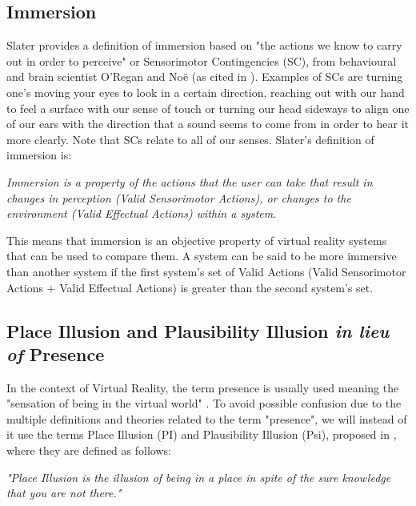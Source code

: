 \subsection{Immersion}
\label{subsec:immersion}

Slater provides a definition of immersion based on "the actions we know to carry out in order to perceive" or Sensorimotor Contingencies (SC), from behavioural and brain scientist O'Regan and Noë (as cited in \parencite{Slater2009}). Examples of SCs are turning one's moving your eyes to look in a certain direction, reaching out with our hand to feel a surface with our sense of touch or turning our head sideways to align one of our ears with the direction that a sound seems to come from in order to hear it more clearly. Note that SCs relate to all of our senses. Slater's definition of immersion is:

\begin{displayquote}
\textit{Immersion is a property of the actions that the user can take that result in changes in perception (Valid Sensorimotor Actions), or changes to the environment (Valid Effectual Actions) within a system.} \parencite{Slater2009}
\end{displayquote}

This means that immersion is an objective property of virtual reality systems that can be used to compare them. A system can be said to be more immersive than another system if the first system's set of Valid Actions (Valid Sensorimotor Actions + Valid Effectual Actions) is greater than the second system's set.

\subsection{Place Illusion and Plausibility Illusion \textit{in lieu of} Presence}
\label{subsec:PIandPsi}

In the context of Virtual Reality, the term presence is usually used meaning the "sensation of being in the virtual world" \parencite{Schuemie2001}. To avoid possible confusion due to the multiple definitions and theories related to the term "presence", we will instead of it use the terms Place Illusion (PI) and Plausibility Illusion (Psi), proposed in \parencite{Slater2009}, where they are defined as follows:

\begin{displayquote}
\textit{"Place Illusion is the illusion of being in a place in spite of the sure knowledge that you are not there." }
\end{displayquote}

